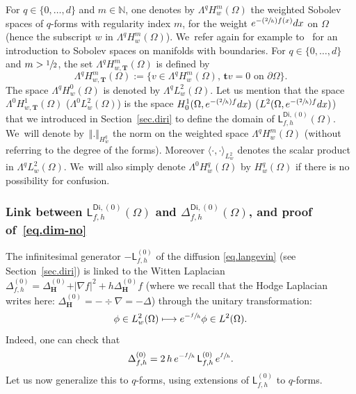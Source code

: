 \documentclass[10pt]{amsart}
\newcommand{\Psfrac}[2]{(\sfrac{#1}{#2})}
\newcommand\mto{\mathchoice{\longmapsto}{\mapsto}{\mapsto}{\mapsto}}
\newcommand{\mbf}[1]{\mathbf{#1}}
\theoremstyle{plain}
\theoremstyle{definition}
\begin{document}
For $q\in \{0, \ldots,d\}$ and $m\in \mathbb N$, one denotes by
$\Lambda^qH^m_w(\Omega)$\label{page.wsobolevq} the weighted Sobolev spaces of $q$-forms with
regularity index $m$, for the weight $e^{-\Psfrac{2}{h} f(x)}dx$ on
$\Omega$ (hence the subscript $w$ in $\Lambda^qH^m_w(\Omega)$). We~refer again for example to~\cite{GSchw} for an introduction to Sobolev spaces on manifolds with boundaries. For $q\in\{0,\ldots,d\}$ and $m> \sfrac{1}{2}$, the set $\Lambda^qH^m_{w,\mbf T}(\Omega)$ is defined by
\[
\Lambda^qH^m_{w,\mbf T}(\Omega):=\{v\in \Lambda^qH^m_w(\Omega),\, \mathbf tv=0 \text{ on }\partial \Omega\}.
\]
The space
$\Lambda^qH^0_w(\Omega)$ is denoted by $\Lambda^qL^2_w(\Omega)$. Let us mention that the space $\Lambda^0H^1_{w,\mbf T}(\Omega)$ (\resp $\Lambda^0L^2_w(\Omega)$) is
the space $H^{1}_{0}(\Omega,e^{-\Psfrac 2h f}dx)$ (\resp $L^2(\Omega,e^{-\Psfrac 2h f}dx)$) that we introduced in Section~\ref{sec.diri} to
define the domain of $\mathsf L^{\mathsf{Di},(0)}_{f,h}(\Omega)$. We~will denote by~$\Vert. \Vert_{H^q_w}$ the norm on the weighted space $\Lambda^qH^m_w
(\Omega)$ (without referring to the degree of the forms). Moreover $\langle
\cdot, \cdot\rangle_{L^2_w}$ denotes the scalar product in $\Lambda^qL^2_w (\Omega)$. We~will also simply denote $\Lambda^0H^q_w(\Omega)$ by $H^q_w(\Omega)$ if there is no possibility for confusion.

\subsubsection{Link between $\mathsf L^{\mathsf{Di}, (0)}_{f,h}(\Omega)$ and $\Delta^{\mathsf{Di}, (0)}_{f,h}(\Omega)$, and proof of~\eqref{eq.dim-no}}

The infinitesimal generator $-\mathsf L^{(0)}_{f,h}$ of the diffusion
\eqref{eq.langevin} (see Section~\ref{sec.diri}) is linked to the
Witten Laplacian $\Delta^{(0)}_{f,h} = \Delta^{(0)}_{\mbf H} +\vert
\nabla f\vert^2+h\Delta^{(0)}_{\mbf H}f$ (where we recall that the
Hodge Laplacian writes here: $\Delta^{(0)}_{\mbf H}=-\div \nabla=-\Delta$)
through the unitary transformation:
\[
\phi \in L^2_w(\Omega) \mto e^{-\sfrac{f}{h}} \phi \in L^2(\Omega).
\]
Indeed, one can check that
\begin{equation}\label{eq:unitary_p0}
\Delta^{ (0)}_{f,h} = 2\, h \, e^{-\sfrac{f}{h}} \, \mathsf L^{(0)}_{f,h} \, e^{\sfrac{f}{h}}.
\end{equation}
Let us now generalize this to $q$-forms, using extensions of
$\mathsf L^{(0)}_{f,h}$ to $q$-forms.
\end{document}
